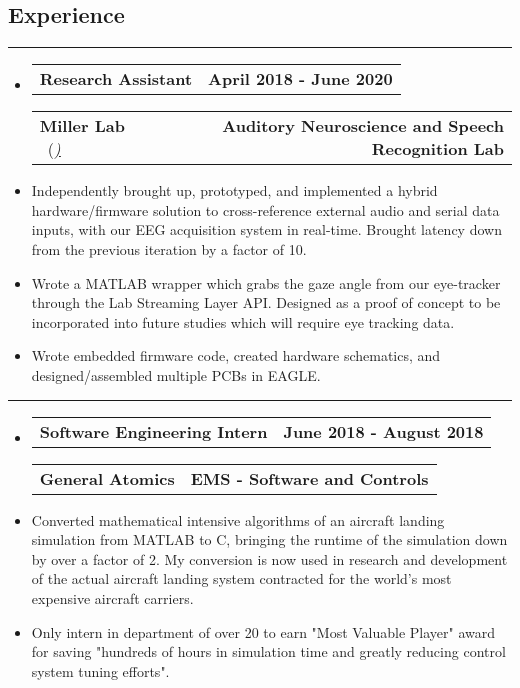 \documentclass[10pt,letterpaper]{article}
\makeatletter
\newcommand{\items}[2]
{
	\begin{tabular*}{\linewidth}{l @{\extracolsep{\fill}} r}
		#1 & #2 \\
	\end{tabular*}
}
\newcommand{\sectionbreak}
{
	\vspace{-1.2em}
	\rule{\textwidth}{1.7pt}
	\vspace{-1.7em}
}
\makeatother
\begin{document}
\vspace{-1.5em}

\subsection*{Experience}
\sectionbreak



\begin{itemize}
	\item[]
		\items
			{\textbf{Research Assistant}} 
			{\textbf{April 2018 - June 2020}}
		\items
		{\textbf{Miller Lab} \ (\href{https://millerlab.faculty.ucdavis.edu}{\small \emph{\underline{\smash{millerlab.faculty.ucdavis.edu})}}} }
			{\textbf{Auditory Neuroscience and Speech Recognition Lab}} 
		\item
			Independently brought up, prototyped, and implemented a hybrid hardware/firmware solution to cross-reference external audio and serial data inputs, with our EEG acquisition system in real-time. Brought latency down from the previous iteration by a factor of 10. 
		\item 
			Wrote a MATLAB wrapper which grabs the gaze angle from our eye-tracker through the Lab Streaming Layer API. Designed as a proof of concept to be incorporated into future studies which will require eye tracking data.
		\item
			Wrote embedded firmware code, created hardware schematics, and designed/assembled multiple PCBs in EAGLE.
\end{itemize}

\hrule

\begin{itemize}
	\item[]
		\items
			{\textbf{Software Engineering Intern}} 
			{\textbf{June 2018 - August 2018}}
		\items
			{\textbf{General Atomics}}
			{\textbf{EMS - Software and Controls}} 
		\item
			Converted mathematical intensive algorithms of an aircraft landing simulation from MATLAB to C, bringing the runtime of the simulation down by over a factor of 2. My conversion is now used in research and development of the actual aircraft landing system contracted for the world’s most expensive aircraft carriers.
		\item
			Only intern in department of over 20 to earn "Most Valuable Player" award for saving "hundreds of hours in simulation time and greatly reducing control system tuning efforts".

\end{itemize}
\end{document}

